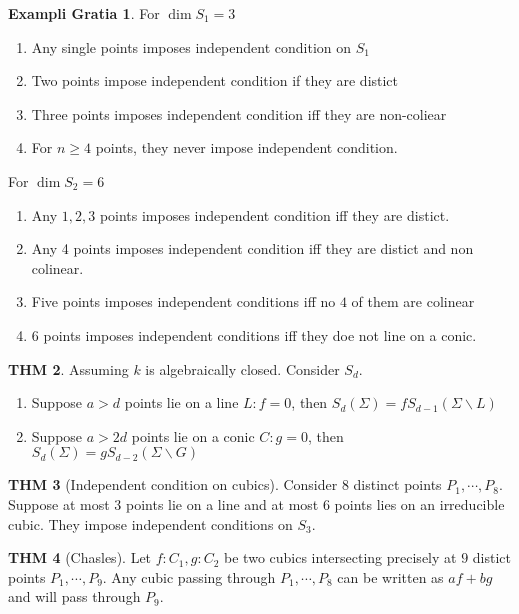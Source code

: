 \documentclass[twocolumn]{article}
\theoremstyle{definition}
\newtheorem{thm}{THM}
\newtheorem{example}[thm]{Exampli Gratia}
\theoremstyle{remark}
\begin{document}
\begin{example}
	For $\dim{S_1} = 3$
	\begin{enumerate}
		\item Any single points imposes independent condition on $S_1$
		\item Two points impose independent condition if they are distict
		\item Three points imposes independent condition iff they are non-coliear
		\item For $n \geq 4$ points, they never impose independent condition.
	\end{enumerate}

	For $\dim{S_2} = 6$
	\begin{enumerate}
		\item Any $1, 2, 3$ points imposes independent condition  iff they are distict.
		\item Any 4 points imposes independent condition iff they are distict and non colinear.
		\item Five points imposes independent conditions iff no $4$ of them are colinear
		\item 6 points imposes independent conditions iff they doe not line on a conic.
	\end{enumerate}
\end{example}

\begin{thm}
	Assuming $k$ is algebraically closed. Consider $S_d$.
	\begin{enumerate}
		\item Suppose $a > d$ points lie on a line $L: f = 0$, then $S_d(\Sigma) = f S_{d-1}(\Sigma \backslash L)$
		\item Suppose $a > 2d$ points lie on a conic $C: g = 0$, then $S_d(\Sigma) = g S_{d-2}(\Sigma \backslash G)$
	\end{enumerate}
\end{thm}

\begin{thm}[Independent condition on cubics]
	Consider $8$ distinct points $P_1, \cdots, P_8$. Suppose at most $3$ points lie on a line and at most $6$ points lies on an irreducible cubic. They impose independent conditions on $S_3$.
\end{thm}

\begin{thm}[Chasles]
	Let $f:C_1, g:C_2$ be two cubics intersecting precisely at $9$ distict points $P_1, \cdots, P_9$. 
	Any cubic passing through $P_1, \cdots, P_8$ can be written as $af + bg$ and will pass through $P_9$.
\end{thm}
\end{document}
